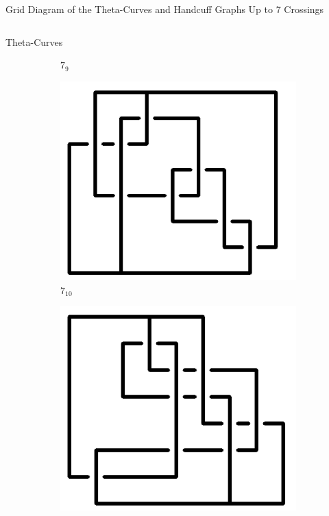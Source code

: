 \documentclass[final]{beamer}
\begin{document}
\begin{frame}[t]
\begin{alertblock}{Grid Diagram of the Theta-Curves and Handcuff Graphs Up to 7 Crossings}
\begin{columns}[t]
\begin{column}{0.5\textwidth}
\begin{alertblock}{Theta-Curves}
\begin{figure}
\begin{subfigure}{0.075\textwidth}
    \caption{$7_{9}$} 
    \end{subfigure}
    \begin{subfigure}{0.075\textwidth}
    \includegraphics[width=\columnwidth]{../Midterm_Poster/grid_diagram/theta_7_10.png}
    \caption{$7_{10}$} 
    \end{subfigure}
    \begin{subfigure}{0.075\textwidth}
    \includegraphics[width=\columnwidth]{../Midterm_Poster/grid_diagram/theta_7_11.png}

\end{subfigure}
\end{figure}
\end{alertblock}
\end{column}
\end{columns}
\end{alertblock}
\end{frame}
\end{document}
